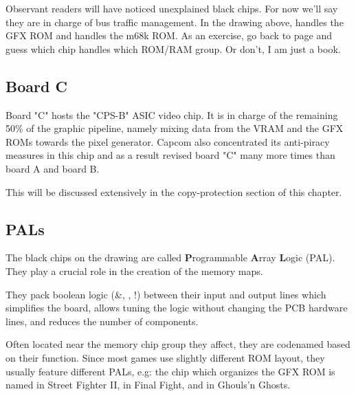 
Observant readers will have noticed unexplained black chips. For now we'll say they are in charge of bus traffic management. In the drawing above,  handles the GFX ROM and  handles the m68k ROM. As an exercise, go back to page \pageref{fig:drawboarda} and guess which chip handles which ROM/RAM group. Or don't, I am just a book.

\subsection{Board C}
Board "C" hosts the "CPS-B" ASIC video chip. It is in charge of the remaining 50\% of the graphic pipeline, namely mixing data from the VRAM and the GFX ROMs towards the pixel generator. Capcom also concentrated its anti-piracy measures in this chip and as a result revised board "C" many more times than board A and board B. 

This will be discussed extensively in the copy-protection section of this chapter.

\begin{minipage}[t]{0.49\linewidth}
\end{minipage}%
\hfill%
\begin{minipage}[t]{0.49\linewidth}
\end{minipage}



\subsection{PALs}
The black chips on the drawing are called \textbf{P}rogrammable \textbf{A}rray \textbf{L}ogic (PAL). They play a crucial role in the creation of the memory maps. 

They pack boolean logic (\&, \textbar, !) between their input and output lines which simplifies the board, allows tuning the logic without changing the PCB hardware lines, and reduces the number of components.


 Often located near the memory chip group they affect, they are codenamed based on their function. Since most games use slightly different ROM layout, they usually feature different PALs, e.g: the chip which organizes the GFX ROM is named  in Street Fighter II,  in Final Fight, and  in Ghouls'n Ghosts.



